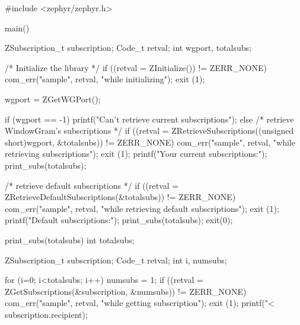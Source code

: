 \begin{code}
#include <zephyr/zephyr.h>

main()
{
    ZSubscription_t subscription;
    Code_t retval;
    int wgport, totalsubs;

    /* Initialize the library */
    if ((retval = ZInitialize()) != ZERR_NONE) {
        com_err("sample", retval, "while initializing");
        exit (1);
    }

    wgport = ZGetWGPort();

    if (wgport == -1)
        printf("Can't retrieve current subscriptions\n");
    else {
        /* retrieve WindowGram's subscriptions */
        if ((retval = ZRetrieveSubscriptions((unsigned short)wgport,
            &totalsubs)) != ZERR_NONE) {
               com_err("sample", retval, "while retrieving subscriptions");
               exit (1);
        }
        printf("Your current subscriptions:\n");
        print_subs(totalsubs);
    }

    /* retrieve default subscriptions */
    if ((retval = ZRetrieveDefaultSubscriptions(&totalsubs)) != ZERR_NONE) {
        com_err("sample", retval,
            "while retrieving default subscriptions");
        exit (1);
    }
    printf("Default subscriptions:\n");
    print_subs(totalsubs);
    exit(0);
}

print_subs(totalsubs)
    int totalsubs;
{
    ZSubscription_t subscription;
    Code_t retval;
    int i, numsubs;

    for (i=0; i<totalsubs; i++) {
        numsubs = 1;
        if ((retval = ZGetSubscriptions(&subscription,
            &numsubs)) != ZERR_NONE) {
                com_err("sample", retval, "while getting subscription");
                exit (1);
        }
        printf("<%
            subscription.recipient);
    }
}

\end{code}
